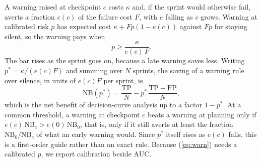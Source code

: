 A warning raised at checkpoint $c$ costs $\kappa$ and, if the sprint would otherwise fail, averts a fraction $e(c)$ of the failure cost $F$, with $e$ falling as $c$ grows. Warning at calibrated risk $p$ has expected cost $\kappa + F p (1 - e(c))$ against $F p$ for staying silent, so the warning pays when
\begin{equation}
p \ge \frac{\kappa}{e(c)\, F}.
\label{eq:warn}
\end{equation}
The bar rises as the sprint goes on, because a late warning saves less. Writing $p^{*} = \kappa / (e(c) F)$ and summing over $N$ sprints, the saving of a warning rule over silence, in units of $e(c) F$ per sprint, is
\begin{equation}
\mathrm{NB}(p^{*}) = \frac{\mathrm{TP}}{N} - p^{*}\, \frac{\mathrm{TP} + \mathrm{FP}}{N},
\label{eq:nb}
\end{equation}
which is the net benefit of decision-curve analysis \cite{vickers2006} up to a factor $1 - p^{*}$. At a common threshold, a warning at checkpoint $c$ beats a warning at planning only if $e(c)\,\mathrm{NB}_c > e(0)\,\mathrm{NB}_0$, that is, only if it still averts at least the fraction $\mathrm{NB}_0 / \mathrm{NB}_c$ of what an early warning would. Since $p^{*}$ itself rises as $e(c)$ falls, this is a first-order guide rather than an exact rule. Because (\ref{eq:warn}) needs a calibrated $p$, we report calibration beside AUC.
